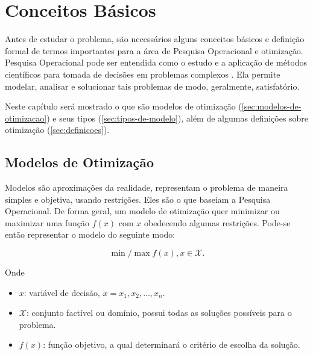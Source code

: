 \chapter{Conceitos Básicos}\label{ch:conceitos-basicos}


Antes de estudar o problema, são necessários alguns conceitos básicos e definição formal de termos importantes para a área de Pesquisa Operacional e otimização.
Pesquisa Operacional pode ser entendida como o estudo e a aplicação de métodos científicos para tomada de decisões em problemas complexos \cite[p.IX]{arenales}.
Ela permite modelar, analisar e solucionar tais problemas de modo, geralmente, satisfatório.

Neste capítulo será mostrado o que são modelos de otimização (\autoref{sec:modelos-de-otimizacao}) e seus tipos (\autoref{sec:tipos-de-modelo}), além de algumas definições sobre otimização (\autoref{sec:definicoes}).


\section{Modelos de Otimização}\label{sec:modelos-de-otimizacao}

Modelos são aproximações da realidade, representam o problema de maneira simples e objetiva, usando restrições.
Eles são o que baseiam a Pesquisa Operacional.
De forma geral, um modelo de otimização quer minimizar ou maximizar uma função $f(x)$ com $x$ obedecendo algumas restrições.
Pode-se então representar o modelo do seguinte modo:

\[
    \min\!/\!\max f(x), x \in \mathcal{X}.
\]

Onde

\begin{itemize}
    \item $x$: variável de decisão, $x = x_1, x_2, \dots, x_n$.
    \item $\mathcal{X}$: conjunto factível ou domínio, possui todas as soluções possíveis para o problema.
    \item $f(x)$: função objetivo, a qual determinará o critério de escolha da solução.
\end{itemize}



